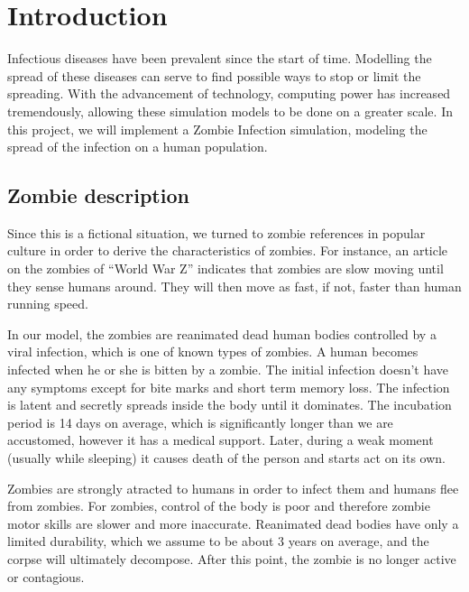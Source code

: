 \documentclass[a4paper]{article}
\title{\mytitle}
\author{Adam Juraszek \and Ryan Leong Wei Shiong \and Matthew Signorini \and Ziying Yang}
\begin{document}
\maketitle
\tableofcontents
\newpage

\section{Introduction} %

Infectious diseases have been prevalent since the start of time.
Modelling the spread of these diseases can serve to find possible ways to stop or limit the spreading.
With the advancement of technology, computing power has increased tremendously, allowing these simulation models to be done on a greater scale.
In this project, we will implement a Zombie Infection simulation, modeling the spread of the infection on a human population.

\subsection{Zombie description}

Since this is a fictional situation, we turned to zombie references in popular culture in order to derive the characteristics of zombies.
For instance, an article on the zombies of ``World War Z'' indicates that zombies are slow moving until they sense humans around.
They will then move as fast, if not, faster than human running speed. \cite{guidetozombies}

In our model, the zombies are reanimated dead human bodies controlled by a viral infection, which is one of known types of zombies. \cite{survivingthedead}
A human becomes infected when he or she is bitten by a zombie.
The initial infection doesn't have any symptoms except for bite marks and short term memory loss.
The infection is latent and secretly spreads inside the body until it dominates.
The incubation period is 14 days on average, which is significantly longer than we are accustomed, however it has a medical support. \cite{mogk2011everything}
Later, during a weak moment (usually while sleeping) it causes death of the person and starts act on its own.

Zombies are strongly atracted to humans in order to infect them and humans flee from zombies.
For zombies, control of the body is poor and therefore zombie motor skills are slower and more inaccurate.
Reanimated dead bodies have only a limited durability, which we assume to be about 3 years on average\cite{zombiepedia}, and the corpse will ultimately decompose.
After this point, the zombie is no longer active or contagious.
\end{document}
